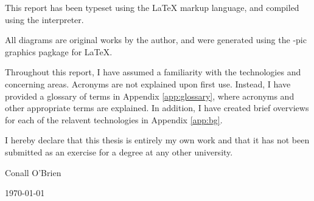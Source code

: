 
This report has been typeset using the \LaTeX{} markup language, 
and compiled using the \LaTeXe{} interpreter. 


All diagrams are original works by the author, and were generated 
using the \Xy-pic{} graphics pagkage for \LaTeX{}.



Throughout this report, I have assumed a familiarity with the
technologies and concerning areas. Acronyms are not explained upon first
use. Instead, I have provided a glossary of terms in Appendix
\ref{app:glossary}, where acronyms and other appropriate terms are
explained. In addition, I have created brief overviews for each 
of the relavent technologies in Appendix \ref{app:bg}.



\vfill


I hereby declare that this thesis is entirely my own work and that it
has not been submitted as an exercise for a degree at any other
university.

\vspace{35mm}

\begin{flushright}

\underline{\hspace*{75mm}}

Conall O'Brien

\today

\end{flushright}
